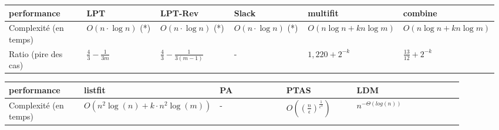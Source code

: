\documentclass[a4paper,12pt]{report}
\theoremstyle{plain}				%
\theoremstyle{definition}				%
\begin{document}
\begin{table}
\begin{center}
\begin{tabular}{p{0.17\linewidth}
				p{0.16\linewidth}
				p{0.16\linewidth}
				p{0.16\linewidth}
				p{0.16\linewidth}
				p{0.16\linewidth}}

\toprule
performance 						&
							LPT 	&
							LPT-Rev &
							Slack 	&
							multifit&
							combine
\\
\midrule

Complexité \newline (en temps) 		&
							$O(n \cdot \log n) $ (*) &		%
							$O(n \cdot \log n)$  (*) & 			%
							$O(n \cdot \log n)$  (*) & 			%
							$O(n \log n + kn \log m)$& 		%
							$O(n \log n + kn \log m)$		%

\\
Ratio \newline (pire des cas)		&
							$\frac{4}{3} - \frac{1}{3m}$&		%
							$\frac{4}{3} - \frac{1}{3(m-1)}$&	%
							-&								%
							$1,220 + 2^{-k}$& 					%
							$\frac{13}{12} + 2^{-k}$			%
\\
\bottomrule
\end{tabular}
\end{center}

\begin{center}
\begin{tabular}{p{0.17\linewidth}
				p{0.16\linewidth}
				p{0.16\linewidth}
				p{0.16\linewidth}
				p{0.25\linewidth}}


\toprule
performance 						&
							listfit &
							PA		&
							PTAS	&
							LDM
\\
\midrule

Complexité \newline (en temps) &
							$O(n^2 \log(n) + k \cdot n^2 \log(m))$&	%
							-& 		%
							$ O(( \frac{n}{\epsilon})^\frac{1}{\epsilon ^ 2})$&
					 		$n^{- \Theta (log(n))}$%


\end{tabular}
\end{center}
\end{table}
\end{document}

